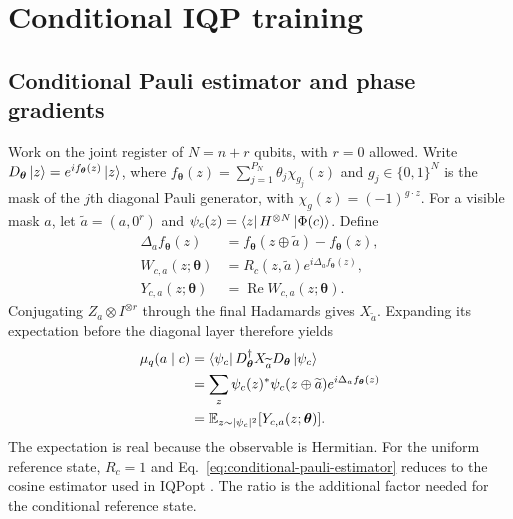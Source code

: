 \documentclass[pra,aps,10pt,twocolumn,floatfix,superscriptaddress,
notitlepage,longbibliography]{revtex4-2}
\newcommand{\bits}{\{0,1\}}
\newcommand{\E}{\mathbb{E}}
\begin{document}
\section{Conditional IQP training}
\label{sec:cond_training}

\subsection{Conditional Pauli estimator and phase gradients}
\label{sec:ratio-estimator}

Work on the joint register of $N=n+r$ qubits, with $r=0$ allowed. Write $D_{\boldsymbol\theta}\ket z=e^{if_{\boldsymbol\theta}(z)}\ket z$, where $f_{\boldsymbol\theta}(z)=\sum_{j=1}^{P_N}\theta_j\chi_{g_j}(z)$ and $g_j\in\bits^N$ is the mask of the $j$th diagonal Pauli generator, with $\chi_g(z)=(-1)^{g\cdot z}$. For a visible mask $a$, let $\widetilde a=(a,0^r)$ and $\psi_c(z)=\bra z H^{\otimes N}\ket{\Phi(c)}$. Define
\begin{equation}
\begin{aligned}
    \Delta_a f_{\boldsymbol\theta}(z)
      &=f_{\boldsymbol\theta}(z\oplus\widetilde a)-f_{\boldsymbol\theta}(z),\\
    W_{c,a}(z;\boldsymbol\theta)
      &=R_c(z,\widetilde a)e^{i\Delta_a f_{\boldsymbol\theta}(z)},\\
    Y_{c,a}(z;\boldsymbol\theta)&=\operatorname{Re}W_{c,a}(z;\boldsymbol\theta).
\end{aligned}
\label{eq:ratio-sample}
\end{equation}
Conjugating $Z_a\otimes I^{\otimes r}$ through the final Hadamards gives $X_{\widetilde a}$. Expanding its expectation before the diagonal layer therefore yields
\begin{equation}
\begin{aligned}
    \mu_q(a\mid c)
    &=\bra{\psi_c}D_{\boldsymbol\theta}^{\dagger}
      X_{\widetilde a}D_{\boldsymbol\theta}\ket{\psi_c}\\
    &=\sum_z\psi_c(z)^*\psi_c(z\oplus\widetilde a)
       e^{i\Delta_a f_{\boldsymbol\theta}(z)}\\
    &=\E_{z\sim|\psi_c|^2}[Y_{c,a}(z;\boldsymbol\theta)].
\end{aligned}
\label{eq:conditional-pauli-estimator}
\end{equation}
The expectation is real because the observable is Hermitian. For the uniform reference state, $R_c=1$ and Eq.~\eqref{eq:conditional-pauli-estimator} reduces to the cosine estimator used in IQPopt \cite{recio-armengolIQPoptFastOptimization2025}. The ratio is the additional factor needed for the conditional reference state.
\end{document}
